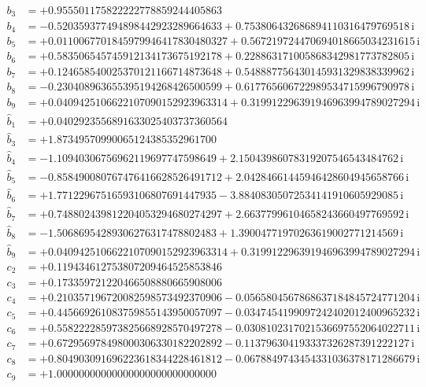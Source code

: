 {\begin{align*}
b_{3} &= +0.955501175822222778859244405863\\
b_{4} &= -0.520359377494898442923289664633 + 0.753806432686894110316479769518\,\mathrm{i}\\
b_{5} &= +0.0110067701845979946417830480327 + 0.567219724470694018665034231615\,\mathrm{i}\\
b_{6} &= +0.583506545745912134173675192178 + 0.228863171005868342981773782805\,\mathrm{i}\\
b_{7} &= +0.124658540025370121166714873648 + 0.548887756430145931329838339962\,\mathrm{i}\\
b_{8} &= -0.230408963655395194268426500599 + 0.617765606722989534715996790978\,\mathrm{i}\\
b_{9} &= +0.0409425106622107090152923963314 + 0.319912296391946963994789027294\,\mathrm{i}\\[1mm]
\hat b_{1} &= +0.0402923556891633025403737360564\\
\hat b_{3} &= +1.87349570990065124385352961700\\
\hat b_{4} &= -1.10940306756962119697747598649 + 2.15043986078319207546543484762\,\mathrm{i}\\
\hat b_{5} &= -0.858490080767476416628526491712 + 2.04284661445946428604945658766\,\mathrm{i}\\
\hat b_{6} &= +1.77122967516593106807691447935 - 3.88408305072534141910605929085\,\mathrm{i}\\
\hat b_{7} &= +0.748802439812204053294680274297 + 2.66377996104658243660497769592\,\mathrm{i}\\
\hat b_{8} &= -1.50686954289306276317478802483 + 1.39004771970263619002771214569\,\mathrm{i}\\
\hat b_{9} &= +0.0409425106622107090152923963314 + 0.319912296391946963994789027294\,\mathrm{i}\\[1mm]
c_{2} &= +0.119434612753807209464525853846\\
c_{3} &= +0.173359721220466508880665908006\\
c_{4} &= +0.210357196720082598573492370906 - 0.0565804567868637184845724771204\,\mathrm{i}\\
c_{5} &= +0.445669261083759855143950057097 - 0.0347454199097242402012400965232\,\mathrm{i}\\
c_{6} &= +0.558222285973825668928570497278 - 0.0308102317021536697552064022711\,\mathrm{i}\\
c_{7} &= +0.672956978498000306330182202892 - 0.113796304193337326287391222127\,\mathrm{i}\\
c_{8} &= +0.804903091696223618344228461812 - 0.0678849743454331036378171286679\,\mathrm{i}\\
c_{9} &= +1.00000000000000000000000000000
\end{align*}
}

